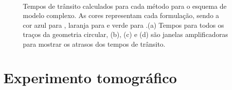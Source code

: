 \begin{figure}[H]
	\centering
	 \\
	 \hfill
	 \hfill
	\caption{Tempos de trânsito calculados para cada método para o esquema de modelo complexo. As cores representam cada formulação, sendo a cor azul para , laranja para  e verde para .(a) Tempos para todos os traços da geometria circular, (b), (c) e (d) são janelas amplificadoras para mostrar os atrasos dos tempos de trânsito.}
	\label{fig:result_overthrust}	
\end{figure}

\section{Experimento tomográfico}

